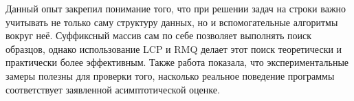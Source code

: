 Данный опыт закрепил понимание того, что при решении задач на строки важно учитывать не только саму структуру данных, но и вспомогательные алгоритмы вокруг неё. Суффиксный массив сам по себе позволяет выполнять поиск образцов, однако использование LCP и RMQ делает этот поиск теоретически и практически более эффективным. Также работа показала, что экспериментальные замеры полезны для проверки того, насколько реальное поведение программы соответствует заявленной асимптотической оценке.

\pagebreak